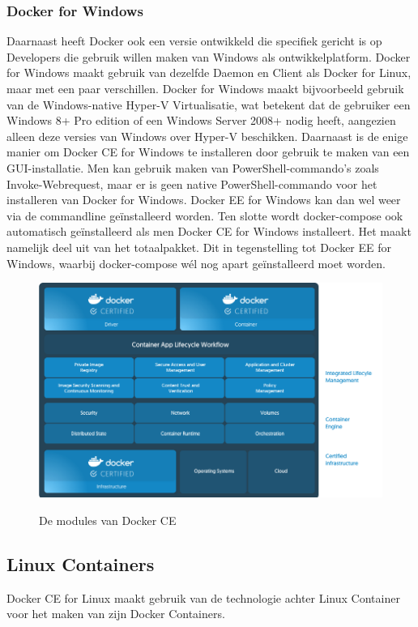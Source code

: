 \subsubsection{Docker for Windows}
Daarnaast heeft Docker ook een versie ontwikkeld die specifiek gericht is op Developers die gebruik willen maken van Windows als ontwikkelplatform. Docker for Windows maakt gebruik van dezelfde Daemon en Client als Docker for Linux, maar met een paar verschillen. Docker for Windows maakt bijvoorbeeld gebruik van de Windows-native Hyper-V Virtualisatie, wat betekent dat de gebruiker een Windows 8+ Pro edition of een Windows Server 2008+ nodig heeft, aangezien alleen deze versies van Windows over Hyper-V beschikken. Daarnaast is de enige manier om Docker CE for Windows te installeren door gebruik te maken van een GUI-installatie. Men kan gebruik maken van PowerShell-commando's zoals Invoke-Webrequest, maar er is geen native PowerShell-commando voor het installeren van Docker for Windows. Docker EE for Windows kan dan wel weer via de commandline geïnstalleerd worden. Ten slotte wordt docker-compose ook automatisch geïnstalleerd als men Docker CE for Windows installeert. Het maakt namelijk deel uit van het totaalpakket. Dit in tegenstelling tot Docker EE for Windows, waarbij docker-compose wél nog apart geïnstalleerd moet worden. 

\begin{figure}
	\caption{De modules van Docker CE}
	\includegraphics[scale=0.5]{img/dockerce.png}
	\label{fig:dockerce}
\end{figure}

\autocite{Fulton2017}

\subsection{Linux Containers}
Docker CE for Linux maakt gebruik van de technologie achter Linux Container voor het maken van zijn Docker Containers.

